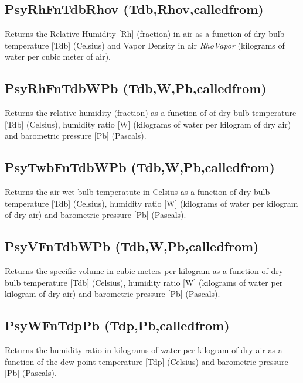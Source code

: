 \subsection{PsyRhFnTdbRhov (Tdb,Rhov,calledfrom)}\label{psyrhfntdbrhov-tdbrhovcalledfrom}

Returns the Relative Humidity {[}Rh{]} (fraction) in air as a function of dry bulb temperature {[}Tdb{]} (Celsius) and Vapor Density in air \emph{RhoVapor} (kilograms of water per cubic meter of air).

\subsection{PsyRhFnTdbWPb (Tdb,W,Pb,calledfrom)}\label{psyrhfntdbwpb-tdbwpbcalledfrom}

Returns the relative humidity (fraction) as a function of of dry bulb temperature {[}Tdb{]} (Celsius), humidity ratio {[}W{]} (kilograms of water per kilogram of dry air) and barometric pressure {[}Pb{]} (Pascals).

\subsection{PsyTwbFnTdbWPb (Tdb,W,Pb,calledfrom)}\label{psytwbfntdbwpb-tdbwpbcalledfrom}

Returns the air wet bulb temperatute in Celsius as a function of dry bulb temperature {[}Tdb{]} (Celsius), humidity ratio {[}W{]} (kilograms of water per kilogram of dry air) and barometric pressure {[}Pb{]} (Pascals).

\subsection{PsyVFnTdbWPb (Tdb,W,Pb,calledfrom)}\label{psyvfntdbwpb-tdbwpbcalledfrom}

Returns the specific volume in cubic meters per kilogram as a function of dry bulb temperature {[}Tdb{]} (Celsius), humidity ratio {[}W{]} (kilograms of water per kilogram of dry air) and barometric pressure {[}Pb{]} (Pascals).

\subsection{PsyWFnTdpPb (Tdp,Pb,calledfrom)}\label{psywfntdppb-tdppbcalledfrom}

Returns the humidity ratio in kilograms of water per kilogram of dry air as a function of the dew point temperature {[}Tdp{]} (Celsius) and barometric pressure {[}Pb{]} (Pascals).

